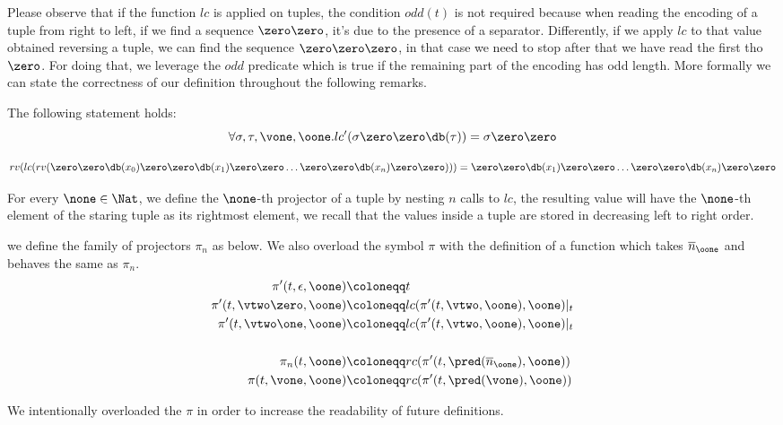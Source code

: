 Please observe that if the function $lc$ is applied on tuples, the condition $odd(t)$ is not required because when reading the encoding of a tuple from right to left, if we find a sequence $\zero\zero$, it's due to the presence of a separator. Differently, if we apply $lc$ to that value obtained reversing a tuple, we can find the sequence $\zero\zero\zero$, in that case we need to stop after that we have read the first tho $\zero$. For doing that, we  leverage the $odd$ predicate which is true if the remaining part of the encoding has odd length. More formally we can state the correctness of our definition throughout the following remarks.

\begin{remark}[Correctness of $lc$] The following statement holds:
\[
\forall \sigma,\tau,\vone, \oone. lc' (\sigma\zero\zero\db(\tau)) = \sigma\zero\zero
\]
\end{remark}

\begin{remark}
\label{remark:rvlcrv}
\[
rv(lc(rv(\zero\zero\db(x_0)\zero\zero\db(x_1)\zero\zero\ldots \zero\zero \db(x_n)\zero \zero))) = \zero \zero \db(x_1)\zero\zero\ldots \zero\zero \db(x_n)\zero\zero
\]
\end{remark}

For every $\none \in \Nat$, we define the $\none$-th projector of a tuple by nesting $n$ calls to $lc$, the resulting value will have the $\none$-th element of the staring tuple as its rightmost element, we recall that the values inside a tuple are stored in decreasing left to right order.

\begin{defn}
we define the family of projectors $\pi_n$ as below. We also overload the symbol $\pi$ with the definition of a function which takes $\overline n_\oone$ and behaves the same as $\pi_n$.
\begin{align*}
\pi'(t, \epsilon, \oone)&\coloneqq t\\
\pi'(t, \vtwo\zero, \oone) &\coloneqq lc(\pi'(t, \vtwo, \oone), \oone)|_t\\
\pi'(t, \vtwo\one, \oone) &\coloneqq lc(\pi'(t, \vtwo, \oone), \oone)|_t\\\\
\pi_n(t, \oone) &\coloneqq rc(\pi'(t, \pred(\overline n_\oone), \oone))\\
\pi(t, \vone, \oone) &\coloneqq rc(\pi'(t, \pred(\vone), \oone))
\end{align*}
\end{defn}
We intentionally overloaded the $\pi$ in order to increase the readability of future definitions.

